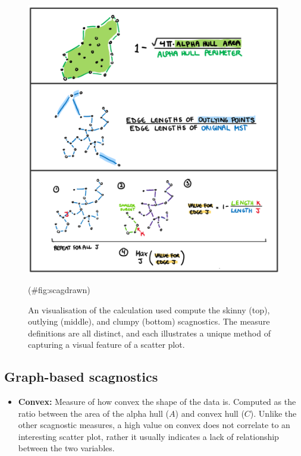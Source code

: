 \begin{Schunk}
\begin{figure}
\includegraphics[width=1\linewidth]{figures/drawnmeasures} \caption[ An visualisation of the calculation used compute the skinny (top), outlying (middle), and clumpy (bottom) scagnostics]{ An visualisation of the calculation used compute the skinny (top), outlying (middle), and clumpy (bottom) scagnostics. The measure definitions are all distinct, and each illustrates a unique method of capturing a visual feature of a scatter plot.}(\#fig:scagdrawn)
\end{figure}
\end{Schunk}

\hypertarget{graph-based-scagnostics}{%
\subsection{Graph-based scagnostics}\label{graph-based-scagnostics}}

\begin{itemize}
\tightlist
\item
  \textbf{Convex:} Measure of how convex the shape of the data is.
  Computed as the ratio between the area of the alpha hull (\(A\)) and
  convex hull (\(C\)). Unlike the other scagnostic measures, a high
  value on convex does not correlate to an interesting scatter plot,
  rather it usually indicates a lack of relationship between the two
  variables.
\end{itemize}

